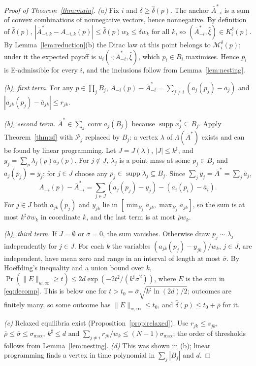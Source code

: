 \documentclass[preprint,11pt]{elsarticle}
\theoremstyle{definition}
\theoremstyle{remark}
\newcommand{\cP}{\mathcal{P}}
\newcommand{\cM}{\mathcal{M}}
\newcommand{\ub}{\bar u}
\newcommand{\abar}{\bar a}
\newcommand{\Abar}{\bar A}
\newcommand{\conv}{\operatorname{conv}}
\newcommand{\supp}{\operatorname{supp}}
\begin{document}
\begin{proof}[Proof of Theorem~\ref{thm:main}]
\emph{(a)} Fix $i$ and $\delta\ge\hat\delta(p)$. The anchor $\Abar^*_{-i}$ is a sum of convex combinations of nonnegative vectors, hence nonnegative. By definition of $\hat\delta(p)$, $|\Abar^*_{-i,k}-A_{-i,k}(p)|\le\hat\delta(p)w_k\le\delta w_k$ for all $k$, so $(\Abar^*_{-i},\hat\xi)\in K_i^\delta(p)$. By Lemma~\ref{lem:reduction}(b) the Dirac law at this point belongs to $\cM_i^\delta(p)$; under it the expected payoff is $\ub_i(\cdot;\Abar^*_{-i},\hat\xi)$, which $p_i\in B_i$ maximises. Hence $p_i$ is E-admissible for every $i$, and the inclusions follow from Lemma~\ref{lem:nesting}.

\emph{(b), first term.} For any $p\in\prod_jB_j$, $A_{-i}(p)-\Abar^*_{-i}=\sum_{j\ne i}(a_j(p_j)-\abar_j)$ and $|a_{jk}(p_j)-\abar_{jk}|\le r_{jk}$.

\emph{(b), second term.} $\Abar^*\in\sum_j\conv a_j(B_j)$ because $\supp x_j^*\subseteq B_j$. Apply Theorem~\ref{thm:sf} with $\cP_j$ replaced by $B_j$: a vertex $\lambda$ of $\Lambda(\Abar^*)$ exists and can be found by linear programming. Let $J=J(\lambda)$, $|J|\le k^\sharp$, and $y_j=\sum_p\lambda_j(p)a_j(p)$. For $j\notin J$, $\lambda_j$ is a point mass at some $p_j\in B_j$ and $a_j(p_j)=y_j$; for $j\in J$ choose any $p_j\in\supp\lambda_j\subseteq B_j$. Since $\sum_jy_j=\Abar^*=\sum_j\abar_j$,
\begin{equation}\label{eq:decomp}
A_{-i}(p)-\Abar^*_{-i}=\textstyle\sum_{j\in J}(a_j(p_j)-y_j)-(a_i(p_i)-\abar_i).
\end{equation}
For $j\in J$ both $a_{jk}(p_j)$ and $y_{jk}$ lie in $[\min_{B_j}a_{jk},\max_{B_j}a_{jk}]$, so the sum is at most $k^\sharp\bar\sigma w_k$ in coordinate $k$, and the last term is at most $\bar\rho w_k$.

\emph{(b), third term.} If $J=\emptyset$ or $\bar\sigma=0$, the sum vanishes. Otherwise draw $p_j\sim\lambda_j$ independently for $j\in J$. For each $k$ the variables $(a_{jk}(p_j)-y_{jk})/w_k$, $j\in J$, are independent, have mean zero and range in an interval of length at most $\bar\sigma$. By Hoeffding's inequality and a union bound over $k$, $\Pr(\|E\|_{w,\infty}\ge t)\le2d\exp(-2t^2/(k^\sharp\bar\sigma^2))$, where $E$ is the sum in \eqref{eq:decomp}. This is below one for $t>t_0=\bar\sigma\sqrt{k^\sharp\ln(2d)/2}$; outcomes are finitely many, so some outcome has $\|E\|_{w,\infty}\le t_0$, and $\hat\delta(p)\le t_0+\bar\rho$ for it.

\emph{(c)} Relaxed equilibria exist (Proposition~\ref{prop:relaxed}). Use $r_{jk}\le s_{jk}$, $\bar\rho\le\bar\sigma\le\sigma_{\max}$, $k^\sharp\le d$ and $\sum_{j\ne i}r_{jk}/w_k\le(N-1)\sigma_{\max}$; the order of thresholds follows from Lemma~\ref{lem:nesting}. \emph{(d)} This was shown in (b); linear programming finds a vertex in time polynomial in $\sum_j|B_j|$ and $d$.
\end{proof}
\end{document}
